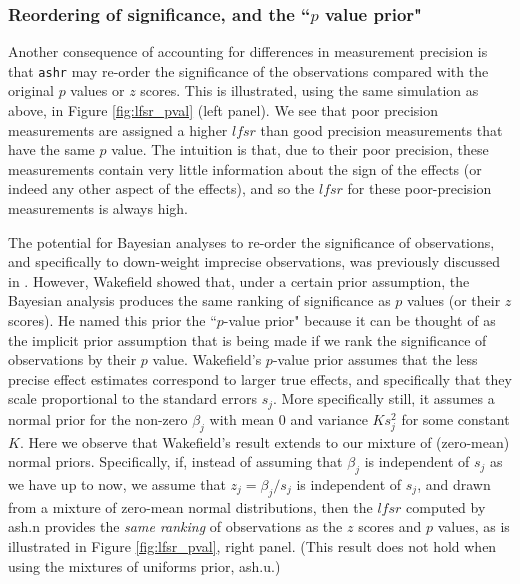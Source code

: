 \documentclass[11pt]{article}
\def\lfsr{\textit{lfsr}}
\def\ashr{{\tt ashr}\xspace}
\begin{document}
 \subsubsection*{Reordering of significance, and the ``$p$ value prior"}

Another consequence of accounting for differences in measurement precision is that \ashr may re-order the significance of the observations compared
 with the original $p$ values or $z$ scores. This is illustrated, using the same simulation as above, in Figure \ref{fig:lfsr_pval} (left panel).
 We see that poor precision measurements are assigned a higher $\lfsr$ than good precision measurements that have the same $p$ value.
 The intuition is that, due to their poor precision, these measurements contain very little information about the sign of the effects (or indeed any other aspect of the effects),
 and so the $\lfsr$ for these poor-precision measurements is always high.
 
The potential for Bayesian analyses to re-order the significance of observations, and specifically to down-weight imprecise observations,
was previously discussed in \cite{guan.stephens.08}. However, Wakefield \cite{wakefield:2009} showed that, under a certain prior assumption, the Bayesian analysis produces the same ranking of significance as $p$ values (or their $z$ scores). He named this prior the ``$p$-value prior" because it can be thought of as the 
implicit prior assumption that is being made if we rank the significance of observations by their $p$ value.
Wakefield's $p$-value prior assumes that the less precise effect estimates correspond to larger true effects, and specifically that they scale proportional
to the standard errors $s_j$. More specifically still, it assumes a normal prior for the non-zero $\beta_j$ with mean 0 and variance $K s^2_j$ for some constant $K$.
Here we observe that Wakefield's result extends to our mixture of (zero-mean) normal priors. Specifically, if, instead of assuming that $\beta_j$ is independent
of $s_j$ as we have up to now, we assume that $z_j=\beta_j/s_j$ is independent of $s_j$, and drawn from a mixture of zero-mean normal distributions,
then the $\lfsr$ computed by ash.n provides the {\it same ranking} of observations as the $z$ scores and $p$ values,
as is illustrated in Figure \ref{fig:lfsr_pval}, right panel. (This result does not hold when using the mixtures of uniforms prior, ash.u.)
\end{document}
